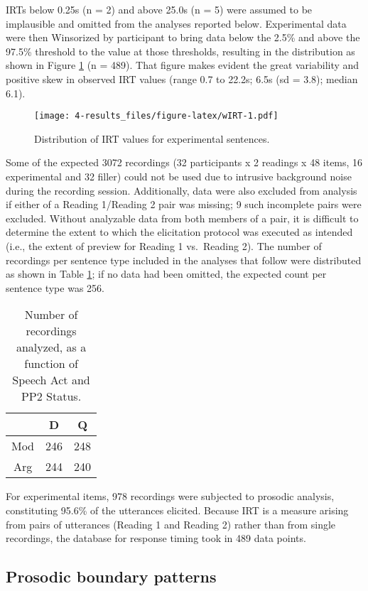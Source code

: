 \documentclass[11pt,oneside]{book}
\begin{document}
IRTs below 0.25s (n = 2) and above 25.0s (n = 5) were assumed to be implausible and omitted from the analyses reported below. Experimental data were then Winsorized by participant to bring data below the 2.5\% and above the 97.5\% threshold to the value at those thresholds, resulting in the distribution as shown in Figure \ref{fig:wIRT} (n = 489). That figure makes evident the great variability and positive skew in observed IRT values (range 0.7 to 22.2s; 6.5s (sd = 3.8); median 6.1).

\begin{figure}
\centering
\texttt{[image: 4-results\_files/figure-latex/wIRT-1.pdf]}
\caption{\label{fig:wIRT}Distribution of IRT values for experimental sentences.}
\end{figure}

Some of the expected 3072 recordings (32 participants x 2 readings x 48 items, 16 experimental and 32 filler) could not be used due to intrusive background noise during the recording session. Additionally, data were also excluded from analysis if either of a Reading 1/Reading 2 pair was missing; 9 such incomplete pairs were excluded. Without analyzable data from both members of a pair, it is difficult to determine the extent to which the elicitation protocol was executed as intended (i.e., the extent of preview for Reading 1 vs.~Reading 2). The number of recordings per sentence type included in the analyses that follow were distributed as shown in Table \ref{tab:rvtab}; if no data had been omitted, the expected count per sentence type was 256.

\begin{table}[!h]

\caption{\label{tab:rvtab}Number of recordings analyzed, as a function of Speech Act and PP2 Status.}
\centering
\begin{tabular}{ccc}
\toprule
  & D & Q\\
\midrule
Mod & 246 & 248\\
Arg & 244 & 240\\
\bottomrule
\end{tabular}
\end{table}

For experimental items, 978 recordings were subjected to prosodic analysis, constituting 95.6\% of the utterances elicited. Because IRT is a measure arising from pairs of utterances (Reading 1 and Reading 2) rather than from single recordings, the database for response timing took in 489 data points.

\hypertarget{results-prosody}{%
\subsection{Prosodic boundary patterns}\label{results-prosody}}
\end{document}
